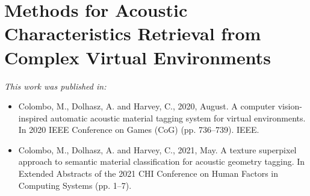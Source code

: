 \chapter{Methods for Acoustic Characteristics Retrieval from Complex Virtual Environments}\label{ch:materials} %

\textit{This work was published in:}\\
\begin{itemize}
\item Colombo, M., Dolhasz, A. and Harvey, C., 2020, August. A computer vision-inspired automatic acoustic material tagging system for virtual environments. In 2020 IEEE Conference on Games (CoG) (pp. 736--739). IEEE.
\item Colombo, M., Dolhasz, A. and Harvey, C., 2021, May. A texture superpixel approach to semantic material classification for acoustic geometry tagging. In Extended Abstracts of the 2021 CHI Conference on Human Factors in Computing Systems (pp. 1--7).
\end{itemize}
\bigskip

